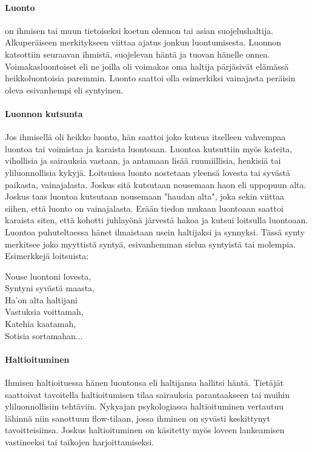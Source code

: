   \paragraph{Luonto} on ihmisen tai muun tietoiseksi koetun olennon tai asian suojelushaltija. 
    Alkuperäiseen merkitykseen viittaa ajatus jonkun luontumisesta. Luonnon katsottiin 
    seuraavan ihmistä, suojelevan häntä ja tuovan hänelle onnea. Voimakasluontoiset eli ne 
    joilla oli voimakas oma haltija pärjäsivät elämässä heikkoluontoisia paremmin. Luonto 
    saattoi olla esimerkiksi vainajasta peräisin oleva esivanhempi eli syntyinen.
  \paragraph{Luonnon kutsunta} Jos ihmisellä oli heikko luonto, hän saattoi joko kutsua itselleen 
    vahvempaa luontoa tai voimistaa ja karaista luontoaan. Luontoa kutsuttiin myös kateita, 
    vihollisia ja sairauksia vastaan, ja antamaan lisää ruumiillisia, henkisiä tai 
    yliluonnollisia kykyjä. Loitsuissa luonto nostetaan yleensä lovesta tai syvästä paikasta, 
    vainajalasta. Joskus sitä kutsutaan nousemaan haon eli uppopuun alta. Joskus taas luontoa 
    kutsutaan nousemaan "haudan alta", joka sekin viittaa siihen, että luonto on vainajalasta. 
    Erään tiedon mukaan luontoaan saattoi karaista siten, että kohotti juhlayönä järvestä 
    hakoa ja kutsui loitsulla luontoaan. Luontoa puhuteltaessa hänet ilmaistaan usein 
    haltijaksi ja synnyksi. Tässä synty merkitsee joko myyttistä syntyä, esivanhemman sielua 
    syntyistä tai molempia. Esimerkkejä loitsuista:

    \begin{center}\begin{em}
      Nouse luontoni lovesta, \\
      Syntyni syvästä maasta, \\
      Ha'on alta haltijani \\
      Vastuksia voittamah, \\
      Katehia kaatamah, \\
      Sotisia sortamahan... \\
    \end{em}\end{center}

  \paragraph{Haltioituminen} Ihmisen haltioituessa hänen luontonsa eli haltijansa hallitsi häntä. 
    Tietäjät saattoivat tavoitella haltioitumisen tilaa sairauksia parantaakseen tai muihin 
    yliluonnollisiin tehtäviin. Nykyajan psykologiassa haltioituminen vertautuu lähinnä niin 
    sanottuun flow-tilaan, jossa ihminen on syvästi keskittynyt tavoitteisiinsa. Joskus 
    haltioituminen on käsitetty myös loveen lankeamisen vastineeksi tai taikojen 
    harjoittamiseksi. 
